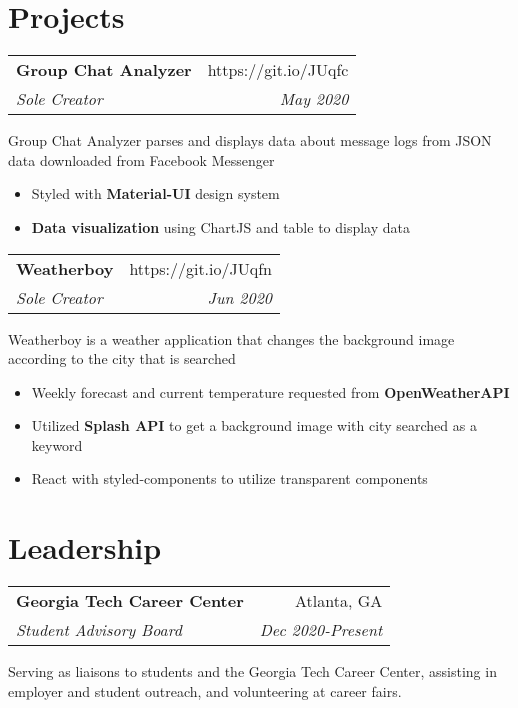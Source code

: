 \documentclass[letterpaper,8pt]{article}
\makeatletter
\newcommand{\resumeSubheading}[4]{
  \vspace{0.25em}
  \begin{tabular*}{1\textwidth}[t]{l@{\extracolsep{\fill}}r}
    \textbf{#1} & #2 \\
    \textit{#3} & \textit{#4} \\
  \end{tabular*}\vspace{-5pt}
}
\makeatother
\begin{document}
\section{Projects}

\resumeSubheading{Group Chat Analyzer}{https://git.io/JUqfc}{Sole Creator}{May 2020}

Group Chat Analyzer parses and displays data about message logs from JSON data downloaded from Facebook Messenger

\begin{itemize}[label=\raisebox{0.25ex}{\tiny$\bullet$}]
  \item Styled with \textbf{Material-UI} design system
  \item \textbf{Data visualization} using ChartJS and table to display data
\end{itemize}
\vspace{5pt}

\resumeSubheading{Weatherboy}{https://git.io/JUqfn}{Sole Creator}{Jun 2020}

Weatherboy is a weather application that changes the background image according to the city that is searched

\begin{itemize}[label=\raisebox{0.25ex}{\tiny$\bullet$}]
  \item Weekly forecast and current temperature requested from \textbf{OpenWeatherAPI}
  \item Utilized \textbf{Splash API} to get a background image with city searched as a keyword
  \item React with styled-components to utilize transparent components
\end{itemize}
\vspace{5pt}

\section{Leadership}

\resumeSubheading{Georgia Tech Career Center}
{Atlanta, GA}{Student Advisory Board}{Dec 2020-Present}

Serving as liaisons to students and the Georgia Tech Career Center, assisting in employer and student outreach, and volunteering at career fairs.
\end{document}
